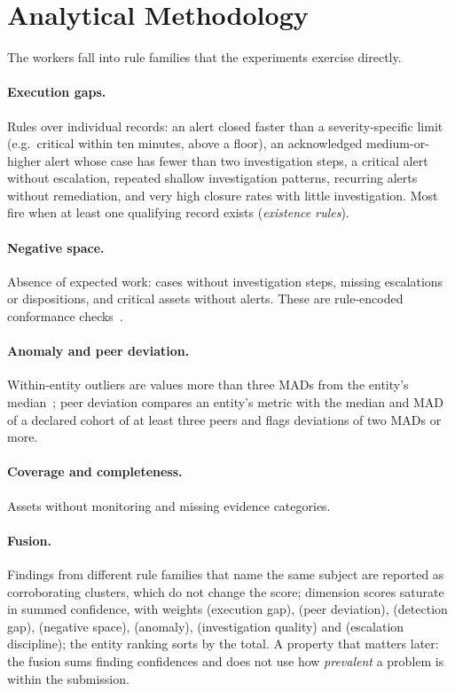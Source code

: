 \section{Analytical Methodology}
\label{sec:analytics}

The workers fall into rule families that the experiments exercise directly.

\paragraph{Execution gaps.} Rules over individual records: an alert closed faster
than a severity-specific limit (e.g.\ critical within ten minutes, above a floor),
an acknowledged medium-or-higher alert whose case has fewer than two investigation
steps, a critical alert without escalation, repeated shallow investigation patterns,
recurring alerts without remediation, and very high closure rates with little
investigation. Most fire when at least one qualifying record exists
(\emph{existence rules}).

\paragraph{Negative space.} Absence of expected work: cases without investigation
steps, missing escalations or dispositions, and critical assets without alerts.
These are rule-encoded conformance checks~\cite{carmona2018conformance}.

\paragraph{Anomaly and peer deviation.} Within-entity outliers are values more than
three MADs from the entity's median~\cite{leys2013mad}; peer deviation compares an
entity's metric with the median and MAD of a declared cohort of at least three
peers and flags deviations of two MADs or more.

\paragraph{Coverage and completeness.} Assets without monitoring and missing
evidence categories.

\paragraph{Fusion.} Findings from different rule families that name the same
subject are reported as corroborating clusters, which do not change the score;
dimension scores saturate in summed confidence, with weights
 (execution gap),  (peer deviation),
 (detection gap),  (negative space),
 (anomaly),  (investigation quality)
and  (escalation discipline); the entity ranking
sorts by the total.
A property that matters later: the fusion sums finding confidences and does not
use how \emph{prevalent} a problem is within the submission.
